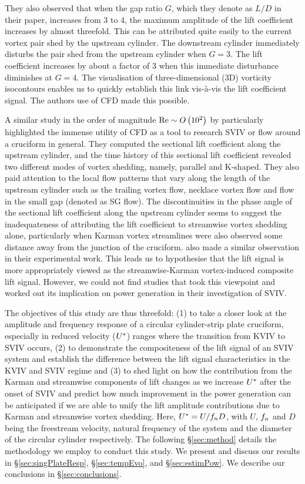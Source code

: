 \documentclass[a4paper,fleqn]{cas-sc}
\begin{document}
They also observed that when the gap ratio $G$, which they denote as  $L/D$  in their paper, increases from 3 to 4, the maximum amplitude of the lift coefficient increases by almost threefold. This can be attributed quite easily to the current vortex pair shed by the upstream cylinder. The downstream cylinder immediately disturbs the pair shed from the upstream cylinder when  $G=3$. The lift coefficient increases by about a factor of 3 when this immediate disturbance diminishes at  $G=4$. The visualisation of three-dimensional (3D) vorticity isocontours enables us to quickly establish this link vis-\`{a}-vis the lift coefficient signal. The authors use of CFD made this possible.

A similar study in the order of magnitude $\text{Re} \sim O \left( 10^{2} \right)$ by \citet{Zhao2018a} particularly highlighted the immense utility of CFD as a tool to research SVIV or flow around a cruciform in general. They computed the sectional lift coefficient along the upstream cylinder, and the time history of this sectional lift coefficient revealed two different modes of vortex shedding, namely, parallel and K-shaped. They also paid attention to the local flow patterns that vary along the length of the upstream cylinder such as the trailing vortex flow, necklace vortex flow and flow in the small gap (denoted as SG flow). The discontinuities in the phase angle of the sectional lift coefficient along the upstream cylinder seems to suggest the inadequateness of attributing the lift coefficient to streamwise vortex shedding alone, particularly when Karman vortex streamlines were also observed some distance away from the junction of the cruciform. \citet{Shirakashi1989} also made a similar observation in their experimental work. This leads us to hypothesise that the lift signal is more appropriately viewed as the streamwise-Karman vortex-induced composite lift signal. However, we could not find studies that took this viewpoint and worked out its implication on power generation in their investigation of SVIV.

The objectives of this study are thus threefold: (1) to take a closer look at the amplitude and frequency response of a circular cylinder-strip plate cruciform, especially in reduced velocity ($U^{*}$) ranges where the transition from KVIV to SVIV occurs, (2) to demonstrate the compositeness of the lift signal of an SVIV system and establish the difference between the lift signal characteristics in the KVIV and SVIV regime and (3) to shed light on how the contribution from the Karman and streamwise components of lift changes as we increase $U^{*}$ after the onset of SVIV and predict how much improvement in the power generation can be anticipated if we are able to unify the lift amplitude contributions due to Karman and streamwise vortex shedding. Here, $U^{*} = U/f_{n} D$, with $U$, $f_{n}$ and $D$ being the freestream velocity, natural frequency of the system and the diameter of the circular cylinder respectively. The following \S\ref{sec:method} details the methodology we employ to conduct this study. We present and discuss our results in \S\ref{sec:singPlateResp}, \S\ref{sec:tempEvo}, and \S\ref{sec:estimPow}. We describe our conclusions in \S\ref{sec:conclusions}.
\end{document}
